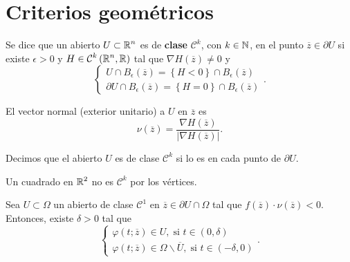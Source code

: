 \section{Criterios geométricos}
\begin{definition}
Se dice que un abierto $\displaystyle U\subset \mathbb{R}^{n} $ es de \textbf{clase} $\displaystyle \mathcal{C}^{k} $, con $\displaystyle k \in \mathbb{N} $, en el punto $\displaystyle \overline{z}\in \partial U $ si existe $\displaystyle \epsilon > 0 $ y $\displaystyle H \in \mathcal{C}^{k}\left(\mathbb{R}^{n}, \mathbb{R}\right) $ tal que $\displaystyle \nabla H\left(\overline{z}\right)\neq 0 $ y 
\[
\begin{cases}
	U \cap B_{\epsilon }\left(\overline{z}\right)= \left\{ H < 0\right\} \cap B_{\epsilon }\left(\overline{z}\right) \\
	\partial U \cap B_{\epsilon }\left(\overline{z}\right)= \left\{ H = 0\right\} \cap B_{\epsilon }\left(\overline{z}\right)
\end{cases}
.\]
\end{definition}
\begin{observation}
El vector normal (exterior unitario) a $\displaystyle U $ en $\displaystyle \overline{z} $ es
\[\nu\left(\overline{z}\right)=\frac{\nabla H\left(\overline{z}\right)}{ \left|\nabla H\left(\overline{z}\right)\right|} .\]
\end{observation}
\begin{notation}
Decimos que el abierto $\displaystyle U $ es de clase $\displaystyle \mathcal{C}^{k} $ si lo es en cada punto de $\displaystyle \partial U $.
\end{notation}
\begin{eg}
Un cuadrado en $\displaystyle \mathbb{R}^{2} $ no es $\displaystyle \mathcal{C}^{k} $ por los vértices. 
\end{eg}
\begin{prop}
Sea $\displaystyle U\subset \Omega  $ un abierto de clase $\displaystyle \mathcal{C}^{1} $ en $\displaystyle \overline{z}\in \partial U \cap \Omega  $ tal que $\displaystyle f\left(\overline{z}\right) \cdot \nu\left(\overline{z}\right)<0 $. Entonces, existe $\displaystyle \delta > 0 $ tal que 
\[
\begin{cases}
\varphi\left(t; \overline{z}\right)\in U, \; \text{si } t \in \left(0, \delta \right) \\
\varphi\left(t; \overline{z}\right)\in \Omega \backslash \overline{U}, \; \text{si } t \in \left(-\delta, 0\right)
\end{cases}
.\]
\end{prop}

